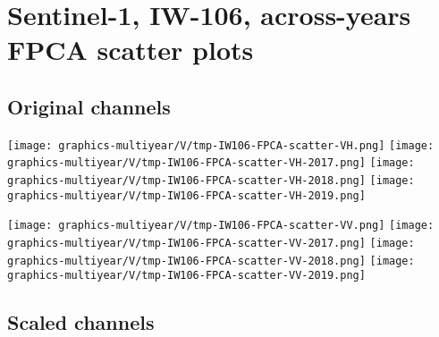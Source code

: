 
\section{Sentinel-1, IW-106, across-years FPCA scatter plots}
\setcounter{theorem}{0}

\renewcommand{\theenumi}{\roman{enumi}}
\renewcommand{\labelenumi}{\textnormal{(\theenumi)}$\;\;$}


\subsection{Original channels}
\label{FPCA-scatter-original}

\begin{center}
\begin{minipage}{7.0in}
\texttt{[image: graphics-multiyear/V/tmp-IW106-FPCA-scatter-VH.png]}
\quad
\texttt{[image: graphics-multiyear/V/tmp-IW106-FPCA-scatter-VH-2017.png]}
\vskip 1.0cm
\texttt{[image: graphics-multiyear/V/tmp-IW106-FPCA-scatter-VH-2018.png]}
\quad
\texttt{[image: graphics-multiyear/V/tmp-IW106-FPCA-scatter-VH-2019.png]}
\end{minipage}
\end{center}


\clearpage
\begin{center}
\begin{minipage}{7.0in}
\texttt{[image: graphics-multiyear/V/tmp-IW106-FPCA-scatter-VV.png]}
\quad
\texttt{[image: graphics-multiyear/V/tmp-IW106-FPCA-scatter-VV-2017.png]}
\vskip 1.0cm
\texttt{[image: graphics-multiyear/V/tmp-IW106-FPCA-scatter-VV-2018.png]}
\quad
\texttt{[image: graphics-multiyear/V/tmp-IW106-FPCA-scatter-VV-2019.png]}
\end{minipage}
\end{center}


\clearpage

\subsection{Scaled channels}
\label{FPCA-scatter-scaled}

